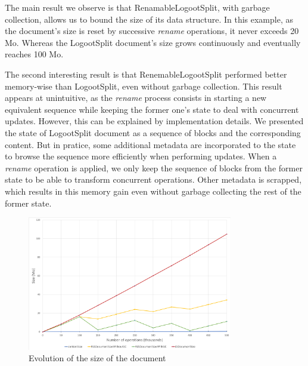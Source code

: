 \documentclass{article}
\theoremstyle{definition}
\begin{document}
The main result we observe is that RenamableLogootSplit, with garbage collection, allows us to bound the size of its data structure.
In this example, as the document's size is reset by successive \emph{rename} operations, it never exceeds 20 Mo.
Whereas the LogootSplit document's size grows continuously and eventually reaches 100 Mo.

The second interesting result is that RenemableLogootSplit performed better memory-wise than LogootSplit, even without garbage collection.
This result appears at unintuitive, as the \emph{rename} process consists in starting a new equivalent sequence while keeping the former one's state to deal with concurrent updates.
However, this can be explained by implementation details.
We presented the state of LogootSplit document as a sequence of blocks and the corresponding content.
But in pratice, some additional metadata are incorporated to the state to browse the sequence more efficiently when performing updates.
When a \emph{rename} operation is applied, we only keep the sequence of blocks from the former state to be able to transform concurrent operations.
Other metadata is scrapped, which results in this memory gain even without garbage collecting the rest of the former state.



\begin{figure}
    \centering
    \includegraphics[width=0.8\textwidth]{img/evolution-document-size.png}
    \caption{Evolution of the size of the document}
    \label{fig:evolution-document-size}
\end{figure}
\end{document}
